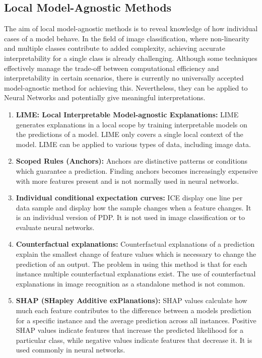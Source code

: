 \subsection{Local Model-Agnostic Methods}

The aim of local model-agnostic methods is to reveal knowledge of how individual cases of a model behave. In the field of image classification, where non-linearity and multiple classes contribute to added complexity, achieving accurate interpretability for a single class is already challenging. Although some techniques effectively manage the trade-off between computational efficiency and interpretability in certain scenarios, there is currently no universally accepted model-agnostic method for achieving this. Nevertheless, they can be applied to Neural Networks and potentially give meaningful interpretations.

\begin{enumerate}
	\item \textbf{LIME: Local Interpretable Model-agnostic Explanations:} LIME\cite{ribeiro2016should} generates explanations in a local scope by training interpretable models on the predictions of a model. LIME only covers a single local context of the model. LIME can be applied to various types of data, including image data.
	\item \textbf{Scoped Rules (Anchors):} Anchors \cite{ribeiro2018} are distinctive patterns or conditions which guarantee a prediction. Finding anchors becomes increasingly expensive with more features present and is not normally used in neural networks. 
	\item \textbf{Individual conditional expectation curves:} ICE \cite{goldstein2014peeking} display one line per data sample and display how the sample changes when a feature changes. It is an individual version of PDP. It is not used in image classification or to evaluate neural networks.
	\item \textbf{Counterfactual explanations:} Counterfactual explanations \cite{wachter2017counterfactual} of a prediction explain the smallest change of feature values which is necessary to change the prediction of an output. The problem in using this method is that for each instance multiple counterfactual explanations exist. The use of counterfactual explanations in image recognition as a standalone method is not common.
	\item \textbf{SHAP (SHapley Additive exPlanations):} SHAP values \cite{lundberg2017unified} calculate how much each feature contributes to the difference between a models prediction for a specific instance and the average prediction across all instances. Positive SHAP values indicate features that increase the predicted likelihood for a particular class, while negative values indicate features that decrease it. It is used commonly in neural networks.
\end{enumerate}

